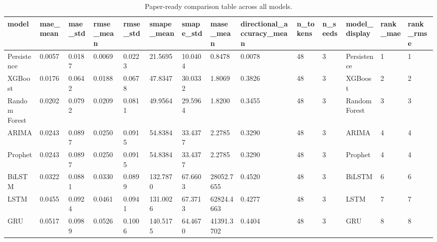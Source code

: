\begin{table}[htbp]
\centering
\begin{tabular}{llllllllllllll}
\hline
model & mae_mean & mae_std & rmse_mean & rmse_std & smape_mean & smape_std & mase_mean & directional_accuracy_mean & n_tokens & n_seeds & model_display & rank_mae & rank_rmse \\
\hline
Persistence & 0.0057 & 0.0187 & 0.0069 & 0.0223 & 21.5695 & 10.0404 & 0.8478 & 0.0078 & 48 & 3 & Persistence & 1 & 1 \\
XGBoost & 0.0176 & 0.0642 & 0.0188 & 0.0678 & 47.8347 & 30.0332 & 1.8069 & 0.3826 & 48 & 3 & XGBoost & 2 & 2 \\
Random Forest & 0.0202 & 0.0792 & 0.0209 & 0.0811 & 49.9564 & 29.5964 & 1.8200 & 0.3455 & 48 & 3 & Random Forest & 3 & 3 \\
ARIMA & 0.0243 & 0.0897 & 0.0250 & 0.0915 & 54.8384 & 33.4377 & 2.2785 & 0.3290 & 48 & 3 & ARIMA & 4 & 4 \\
Prophet & 0.0243 & 0.0897 & 0.0250 & 0.0915 & 54.8384 & 33.4377 & 2.2785 & 0.3290 & 48 & 3 & Prophet & 4 & 4 \\
BiLSTM & 0.0322 & 0.0881 & 0.0330 & 0.0899 & 132.7870 & 67.6603 & 28052.7655 & 0.4520 & 48 & 3 & BiLSTM & 6 & 6 \\
LSTM & 0.0455 & 0.0924 & 0.0461 & 0.0941 & 131.0026 & 67.3713 & 62824.4663 & 0.4277 & 48 & 3 & LSTM & 7 & 7 \\
GRU & 0.0517 & 0.0989 & 0.0526 & 0.1006 & 140.5175 & 64.4670 & 41391.3702 & 0.4404 & 48 & 3 & GRU & 8 & 8 \\
\hline
\end{tabular}
\caption{Paper-ready comparison table across all models.}
\label{table_main_forecasting_comparison}
\end{table}